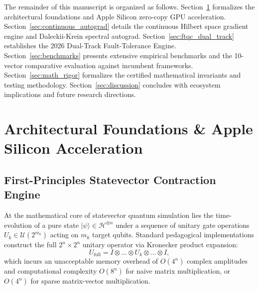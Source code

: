 \documentclass[aps,prx,twocolumn,superscriptaddress,nofootinbib]{revtex4-2}
\newcommand{\ket}[1]{|#1\rangle}
\begin{document}
The remainder of this manuscript is organized as follows. Section~\ref{sec:arch_foundations} formalizes the architectural foundations and Apple Silicon zero-copy GPU acceleration. Section~\ref{sec:continuous_autograd} details the continuous Hilbert space gradient engine and Daleckii-Krein spectral autograd. Section~\ref{sec:ftqc_dual_track} establishes the 2026 Dual-Track Fault-Tolerance Engine. Section~\ref{sec:benchmarks} presents extensive empirical benchmarks and the 10-vector comparative evaluation against incumbent frameworks. Section~\ref{sec:math_rigor} formalizes the certified mathematical invariants and testing methodology. Section~\ref{sec:discussion} concludes with ecosystem implications and future research directions.

\section{Architectural Foundations \& Apple Silicon Acceleration}
\label{sec:arch_foundations}

\subsection{First-Principles Statevector Contraction Engine}
\label{subsec:statevector_core}

At the mathematical core of statevector quantum simulation lies the time-evolution of a pure state $\ket{\psi} \in \mathcal{H}^{\otimes n}$ under a sequence of unitary gate operations $U_k \in \mathcal{U}(2^{m_k})$ acting on $m_k$ target qubits. Standard pedagogical implementations construct the full $2^n \times 2^n$ unitary operator via Kronecker product expansion:
\begin{equation}
    U_{\text{full}} = I \otimes \dots \otimes U_k \otimes \dots \otimes I,
\end{equation}
which incurs an unacceptable memory overhead of $O(4^n)$ complex amplitudes and computational complexity $O(8^n)$ for naive matrix multiplication, or $O(4^n)$ for sparse matrix-vector multiplication.
\end{document}
